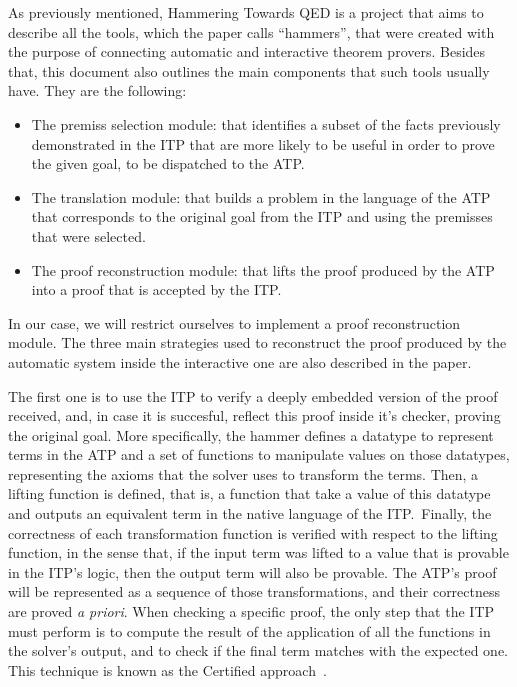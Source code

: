 \label{sec:hammering}
As previously mentioned, Hammering Towards QED is a project
that aims to describe all the tools, which the paper calls ``hammers'',
that were created with the purpose of connecting automatic and interactive
theorem provers. Besides that, this document also outlines
the main components that such tools usually have. They are
the following:

\begin{itemize}
  \item The premiss selection module: that identifies
        a subset of the facts previously demonstrated in the
        ITP that are more likely to be useful in order to
        prove the given goal, to be dispatched to the ATP.\@
  \item The translation module: that builds a problem in the language of the
        ATP that corresponds to the original goal from the ITP and using
        the premisses that were selected.\@
  \item The proof reconstruction module: that lifts the proof produced
        by the ATP into a proof that is accepted by the ITP.\@
\end{itemize}

In our case, we will restrict ourselves to implement a proof reconstruction module.
The three main strategies used to reconstruct the proof produced
by the automatic system inside the interactive one are also described in the paper.

The first one is to use the ITP to verify a deeply embedded version of the proof
received, and, in case it is succesful, reflect this proof inside it's checker, proving
the original goal. More specifically, the hammer defines a datatype to represent
terms in the ATP and a set of functions to manipulate values on those datatypes, representing
the axioms that the solver uses to transform the terms. Then, a lifting function is defined, that is,
a function that take a value of this datatype and outputs an equivalent term in the native
language of the ITP.\ Finally, the correctness of each transformation function is
verified with respect to the lifting function, in the sense that, if the input term
was lifted to a value that is provable in the ITP's logic, then the output term will
also be provable. The ATP's proof will be represented as a sequence of those
transformations, and their correctness are proved \textit{a priori}. When checking
a specific proof, the only step that the ITP must perform is to compute the result
of the application of all the functions in the solver's output, and to check if
the final term matches with the expected one. This technique is known as
the Certified approach\ \cite{snipe}.


